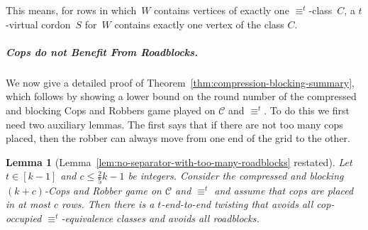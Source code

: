 \documentclass[10pt,a4paper]{article}
\newcommand{\comp}{\equiv}
\newcommand{\grid}{\mathcal{C}}
\newtheorem{lemma}[theorem]{Lemma}
\begin{document}
	\noindent This means, for rows in which~$W$ contains vertices of exactly one $\comp^t$-class~$C$,
	a $t$-virtual cordon~$S$ for~$W$ contains exactly one vertex of the class $C$.


\subparagraph{Cops do not Benefit From Roadblocks.}

We now give a detailed proof of Theorem~\ref{thm:compression-blocking-summary}, which follows by showing a lower bound on the round number of the compressed and blocking Cops and Robbers game played on $\grid$ and $\comp^t$. To do this we first need two auxiliary lemmas. The first says that if there are not too many cops placed, then the robber can always move from one end of the grid to the other. 

\begin{lemma}[Lemma~\ref{lem:no-separator-with-too-many-roadblocks} restated]
	Let $t \in [k-1]$ and $c \leq \frac{2}{5}k-1$ be integers.
	Consider the compressed and blocking $(k + c)$-Cops and Robber
	game on $\grid$ and $\comp^t$
	and assume that cops are placed in at most $c$ rows.
	Then there is a $t$\nobreakdash-end-to-end twisting
	that avoids all cop-occupied $\comp^t$\nobreakdash-equivalence classes
	and avoids all roadblocks.
\end{lemma}
\def\ignorepathfigure{}
%
\end{document}
